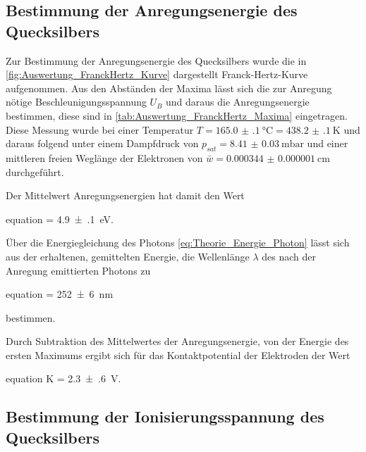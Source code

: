 	
	
	
\subsection{Bestimmung der Anregungsenergie des Quecksilbers}
	
	Zur Bestimmung der Anregungsenergie des Quecksilbers wurde die in \cref{fig:Auswertung_FranckHertz_Kurve}
	dargestellt Franck-Hertz-Kurve aufgenommen. Aus den Abständen der Maxima lässt sich die zur
	Anregung nötige Beschleunigungsspannung $U_{B}$ und daraus die Anregungsenergie bestimmen, diese sind in 
	\cref{tab:Auswertung_FranckHertz_Maxima} eingetragen. Diese Messung wurde bei einer Temperatur
	$T =\SI{165.0(1)}{\degreeCelsius} = \SI{438.2(1)}{\kelvin}$ und daraus folgend unter einem Dampfdruck
	von $p_{sat} = \SI{8.41(3)}{\milli\bar}$ und einer mittleren freien Weglänge der Elektronen 
	von $\bar{w} = \SI{0.000344(1)}{\cm}$ durchgeführt.
	
	
	
	Der Mittelwert Anregungsenergien hat damit den Wert
	
	\begin{empheq}{equation}
		\label{val:Auswertung_Anregungsenergie}
		 = \SI{4.9(1)}{\eV}.
	\end{empheq}
	
	Über die Energiegleichung des Photons \cref{eq:Theorie_Energie_Photon} lässt sich aus der
	erhaltenen, gemittelten Energie, die Wellenlänge $\lambda$ des nach der Anregung emittierten Photons
	zu
	\begin{empheq}{equation}
		\lambda = \SI{252(6)}{\nm}
	\end{empheq}	 	
	bestimmen.
		 	
	Durch Subtraktion des Mittelwertes der Anregungsenergie, von der Energie des ersten Maximums
	ergibt sich für das Kontaktpotential der Elektroden der Wert
	\begin{empheq}{equation}
			K = \SI{2.3(6)}{\volt}.  
			\label{val:Auswertung_K_2}
	\end{empheq}
	  
\subsection{Bestimmung der Ionisierungsspannung des Quecksilbers}
	
